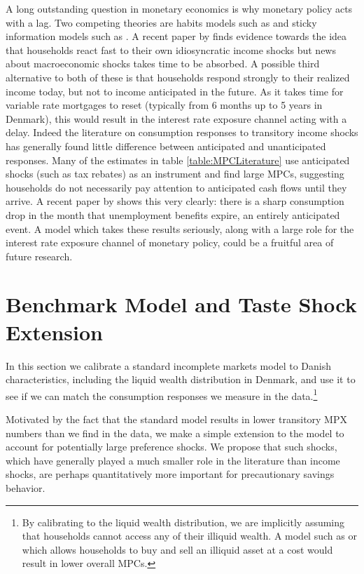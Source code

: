 \documentclass[titlepage]{\econtex}\newcommand{\texname}{ConsumptionHeterogeneity}
\begin{document}
A long outstanding question in monetary economics is why monetary policy acts with a lag. Two competing theories are habits models such as \cite{fuhrer_habit_2000} and sticky information models such as \cite{mankiw_sticky_2002}. A recent paper by \cite{carroll_sticky_2018} finds evidence towards the idea that households react fast to their own idiosyncratic income shocks but news about macroeconomic shocks takes time to be absorbed. A possible third alternative to both of these is that households respond strongly to their realized income today, but not to income anticipated in the future. As it takes time for variable rate mortgages to reset (typically from 6 months up to 5 years in Denmark), this would result in the interest rate exposure channel acting with a delay. Indeed the literature on consumption responses to transitory income shocks has generally found little difference between anticipated and unanticipated responses. Many of the estimates in table \ref{table:MPCLiterature} use anticipated shocks (such as tax rebates) as an instrument and find large MPCs, suggesting households do not necessarily pay attention to anticipated cash flows until they arrive. A recent paper by \cite{ganong_consumer_2017} shows this very clearly: there is a sharp consumption drop in the month that unemployment benefits expire, an entirely anticipated event. A model which takes these results seriously, along with a large role for the interest rate exposure channel of monetary policy, could be a fruitful area of future research. 

\section{Benchmark Model and Taste Shock Extension} \label{model}
In this section we calibrate a standard incomplete markets model to Danish characteristics, including the liquid wealth distribution in Denmark, and use it to see if we can match the consumption responses we measure in the data.\footnote{By calibrating to the liquid wealth distribution, we are implicitly assuming that households cannot access any of their illiquid wealth. A model such as \cite{violante_wealthy_2014} or \cite{gorea_liquidity_2017} which allows households to buy and sell an illiquid asset at a cost would result in lower overall MPCs.}

Motivated by the fact that the standard model results in lower transitory MPX numbers than we find in the data, we make a simple extension to the model to account for potentially large preference shocks. We propose that such shocks, which have generally played a much smaller role in the literature than income shocks, are perhaps quantitatively more important for precautionary savings behavior.
\end{document}
